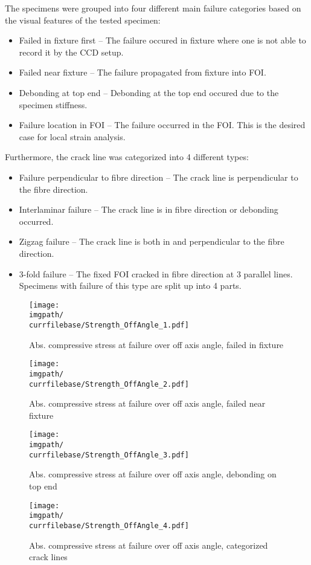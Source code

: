 The specimens were grouped into four different main failure categories based on the visual features of the tested specimen:
\begin{itemize}
    \item[\visfeat{1}] Failed in fixture first -- The failure occured in fixture where one is not able to record it by the CCD setup.
    \item[\visfeat{2}] Failed near fixture -- The failure propagated from fixture into FOI.
    \item[\visfeat{3}] Debonding at top end -- Debonding at the top end occured due to the specimen stiffness.
    \item[\visfeat{4}] Failure location in FOI -- The failure occurred in the FOI. This is the desired case for local strain analysis.
\end{itemize}
Furthermore, the crack line was categorized into 4 different types:
\begin{itemize}
    \item[\visfeat{5}] Failure perpendicular to fibre direction -- The crack line is perpendicular to the fibre direction.
    \item[\visfeat{6}] Interlaminar failure -- The crack line is in fibre direction or debonding occurred.
    \item[\visfeat{7}] Zigzag failure -- The crack line is both in and perpendicular to the fibre direction.
    \item[\visfeat{8}] 3-fold failure -- The fixed FOI cracked in fibre direction at 3 parallel lines. Specimens with failure of this type are split up into 4 parts.
\end{itemize}

\begin{figure}[!ht]
    \centering
    \texttt{[image: \\imgpath/\\currfilebase/Strength\_OffAngle\_1.pdf]}
    \caption{Abs. compressive stress at failure over off axis angle, failed in fixture}
    \label{fig:strength_offAngle_1}
\end{figure}
\begin{figure}[!ht]
    \centering
    \texttt{[image: \\imgpath/\\currfilebase/Strength\_OffAngle\_2.pdf]}
    \caption{Abs. compressive stress at failure over off axis angle, failed near fixture}
    \label{fig:strength_offAngle_2}
\end{figure}
\begin{figure}[!ht]
    \centering
    \texttt{[image: \\imgpath/\\currfilebase/Strength\_OffAngle\_3.pdf]}
    \caption{Abs. compressive stress at failure over off axis angle, debonding on top end}
    \label{fig:strength_offAngle_3}
\end{figure}
\begin{figure}[!ht]
    \centering
    \texttt{[image: \\imgpath/\\currfilebase/Strength\_OffAngle\_4.pdf]}
    \caption{Abs. compressive stress at failure over off axis angle, categorized crack lines}
    \label{fig:strength_offAngle_4}
\end{figure}

